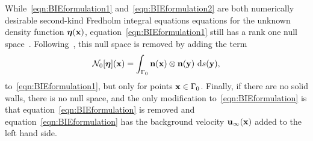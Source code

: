 \documentclass[preprint, 10pt]{elsarticle}
\begin{document}
While~\eqref{eqn:BIEformulation1} and~\eqref{eqn:BIEformulation2} are
both numerically desirable second-kind Fredholm integral equations
equations  for the unknown density function ${\boldsymbol\eta}({\mathbf{x}})$,
equation~\eqref{eqn:BIEformulation1} still has a rank one null
space~\cite{Ladyzhenskaya1963}.  Following~\cite{Power1993}, this null
space is removed by adding the term 
\begin{align}
\label{eq:N0_modification} 
  \mathcal{N}_0[{\boldsymbol\eta}]({\mathbf{x}}) = \int_{\Gamma_0} 
    {\mathbf{n}}({\mathbf{x}})\otimes{\mathbf{n}}({\mathbf{y}})~\text{d}s(\mathbf{y}), 
\end{align}
to~\eqref{eqn:BIEformulation1}, but only for points ${\mathbf{x}} \in \Gamma_0$.
Finally, if there are no solid walls, there is no null space, and
the only modification to~\eqref{eqn:BIEformulation} is that
equation~\eqref{eqn:BIEformulation} is removed and
equation~\eqref{eqn:BIEformulation} has the background velocity
${\mathbf{u}}_\infty({\mathbf{x}})$ added to the left hand side.
\end{document}
